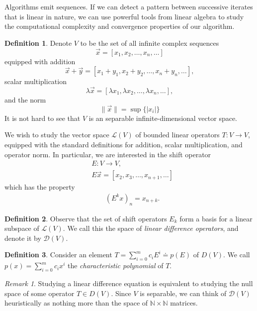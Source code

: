 \documentclass[12pt]{article}
\theoremstyle{plain}
\theoremstyle{definition}
\newtheorem*{definition}{Definition}
\theoremstyle{remark}
\newtheorem*{remark}{Remark}
\numberwithin{equation}{section}  %
\begin{document}
Algorithms emit sequences. If we can detect a pattern between successive
iterates that is linear in nature, we can use powerful tools from linear
algebra to study the computational complexity and convergence properties of our
algorithm.
\begin{definition}
	Denote $V$ to be the set of all infinite complex sequences
	\begin{equation*}
		\vec{x} = [x_1, x_2, \ldots, x_n, \ldots]
	\end{equation*}
	equipped with addition
	\begin{equation*}
		\vec{x} + \vec{y} = [x_1 + y_1, x_2 + y_2, \ldots, x_n + y_n, \ldots],
	\end{equation*}
	scalar multiplication
	\begin{equation*}
		\lambda \vec{x} = [\lambda x_1, \lambda x_2, \ldots, \lambda x_n, \ldots],
	\end{equation*}
	and the norm
	\begin{equation*}
		\| \vec{x} \| = \sup \{|x_i| \}
	\end{equation*}
	It is not hard to see that $V$ is an separable infinite-dimensional vector
	space.
\end{definition}
We wish to study the vector space $\mathcal{L}(V)$ of bounded linear operators
$T:
V \to V$, equipped with the standard definitions for addition, scalar
multiplication, and operator norm.
In particular, we are interested in the shift operator
\begin{align*}
	& E: V \to V,
	\\
	& E \vec{x} = [x_2, x_3, \ldots, x_{n+1}, \ldots]
\end{align*}
which has the property 
\begin{align*}
	& (E^k x)_{n} = x_{n+k}.
\end{align*}
\begin{definition}
	Observe that the set of shift operators ${E_k}$ form a basis for a
	linear subspace of $\mathcal{L}(V)$. We call this the space of
	\emph{linear difference operators}, and denote it by $\mathcal{D}(V)$.
\end{definition}
\begin{definition}
	Consider an element $T = \sum_{i=0}^{m}c_i E^i \doteq p(E)$ of $D(V).$ We call
	$p(x) = \sum_{i=0}^{m} c_i x^i$ the \emph{characteristic polynomial} of $T$.
\end{definition}
\begin{remark}
	Studying a linear difference equation is equivalent to studying the null space
	of some operator $T \in D(V)$. Since $V$ is separable, we can think of
	$\mathcal{D}(V)$ heuristically as nothing more than the space of $\mathbb{N}
	\times \mathbb{N}$ matrices. 
\end{remark}
\end{document}
